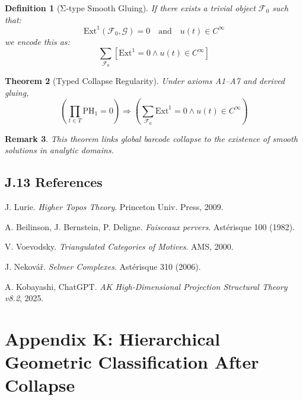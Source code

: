 \documentclass[11pt]{article}
\newtheorem{theorem}{Theorem}[section]
\newtheorem{definition}[theorem]{Definition}
\newtheorem{remark}[theorem]{Remark}
\begin{document}
\begin{axiom}
\begin{axiom}
\begin{definition}[Σ-type Smooth Gluing]
If there exists a trivial object \(\mathcal{F}_0\) such that:
\[
\mathrm{Ext}^1(\mathcal{F}_0, \mathcal{G}) = 0 \quad \text{and} \quad u(t) \in C^\infty
\]
we encode this as:
\[
\sum_{\mathcal{F}_0} [\mathrm{Ext}^1 = 0 \wedge u(t) \in C^\infty]
\]
\end{definition}

\begin{theorem}[Typed Collapse Regularity]
Under axioms A1–A7 and derived gluing,
\[
\boxed{
\left( \prod_{t \in T} \mathrm{PH}_1 = 0 \right)
\Rightarrow
\left( \sum_{\mathcal{F}_0} \mathrm{Ext}^1 = 0 \wedge u(t) \in C^\infty \right)
}
\]
\end{theorem}

\begin{remark}
This theorem links global barcode collapse to the existence of smooth solutions in analytic domains.
\end{remark}


\subsection*{J.13 References}

\begin{thebibliography}{9}

J. Lurie.  
\textit{Higher Topos Theory}. Princeton Univ. Press, 2009.

A. Beilinson, J. Bernstein, P. Deligne.  
\textit{Faisceaux pervers}. Astérisque 100 (1982).

V. Voevodsky.  
\textit{Triangulated Categories of Motives}. AMS, 2000.

J. Nekovář.  
\textit{Selmer Complexes}. Astérisque 310 (2006).

A. Kobayashi, ChatGPT.  
\textit{AK High-Dimensional Projection Structural Theory v8.2}, 2025.

\end{thebibliography}




\section*{Appendix K: Hierarchical Geometric Classification After Collapse}


\end{axiom}
\end{axiom}
\end{document}
